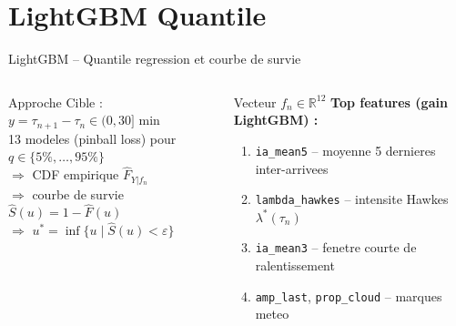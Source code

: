 \documentclass[aspectratio=169, 10pt]{beamer}
\begin{document}
\section{LightGBM Quantile}

\begin{frame}{LightGBM -- Quantile regression et courbe de survie}
  \begin{columns}[T]
      \begin{block}{Approche}
        Cible : $y = \tau_{n+1} - \tau_n \in (0, 30]$ min\\[5pt]
        13 modeles (pinball loss) pour $q \in \{5\%, \ldots, 95\%\}$\\[5pt]
        $\Rightarrow$ CDF empirique $\hat{F}_{Y|f_n}$\\
        $\Rightarrow$ courbe de survie $\hat{S}(u) = 1 - \hat{F}(u)$\\
        $\Rightarrow$ $u^* = \inf\{u \mid \hat{S}(u) < \varepsilon\}$
      \end{block}
      \vspace{0.15cm}
      \begin{block}{Vecteur $f_n \in \mathbb{R}^{12}$}
        \footnotesize
        \textbf{Top features (gain LightGBM) :}
        \begin{enumerate}
          \item \texttt{ia\_mean5} -- moyenne 5 dernieres inter-arrivees
          \item \texttt{lambda\_hawkes} -- intensite Hawkes $\lambda^*(\tau_n)$
          \item \texttt{ia\_mean3} -- fenetre courte de ralentissement
          \item \texttt{amp\_last}, \texttt{prop\_cloud} -- marques meteo
        \end{enumerate}
      \end{block}


\end{columns}
\end{frame}
\end{document}
